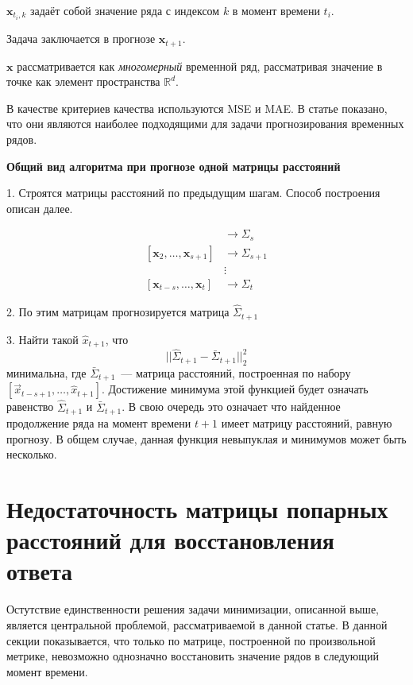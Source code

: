 \documentclass{article}
\begin{document}
$\mathbf{x}_{t_i, k}$ задаёт собой значение ряда с индексом $k$ в момент времени $t_i$.

Задача заключается в прогнозе $\mathbf{x}_{t+1}$.

$\mathbf{x}$ рассматривается как \textit{многомерный} временной ряд, рассматривая значение в точке как элемент пространства $\mathbb{R}^d$.

В качестве критериев качества используются MSE и MAE. В статье \cite{jadon2022comprehensive} показано, что они являются наиболее подходящими для задачи прогнозирования временных рядов.

\textbf{Общий вид алгоритма при прогнозе одной матрицы расстояний}

1. Строятся матрицы расстояний по предыдущим шагам. Способ построения описан далее.

\begin{align*}
	[\mathbf{x}_1, \ldots, \mathbf{x}_s] &\rightarrow \Sigma_s \\
	[\mathbf{x}_2, \ldots, \mathbf{x}_{s+1}] &\rightarrow \Sigma_{s+1} \\
	&\vdots \\
	[\mathbf{x}_{t-s}, \ldots, \mathbf{x}_t] &\rightarrow \Sigma_{t}
\end{align*}

2. По этим матрицам прогнозируется матрица $\hat{\Sigma}_{t+1}$

3. Найти такой $\hat{x}_{t+1}$, что \[ ||\hat{\Sigma}_{t+1} - \bar{\Sigma}_{t+1}||_2^2 \] минимальна, где $\bar{\Sigma}_{t+1}$~--- матрица расстояний, построенная по набору $[\vec{x}_{t-s+1}, \ldots, \hat{x}_{t+1}]$. Достижение минимума этой функцией будет означать равенство $\hat{\Sigma}_{t+1}$ и $\bar{\Sigma}_{t+1}$. В свою очередь это означает что найденное продолжение ряда на момент времени $t+1$ имеет матрицу расстояний, равную прогнозу. В общем случае, данная функция невыпуклая и минимумов может быть несколько.

\section{Недостаточность матрицы попарных расстояний для восстановления ответа}

Остутствие единственности решения задачи минимизации, описанной выше, является центральной проблемой, рассматриваемой в данной статье. В данной секции показывается, что только по матрице, построенной по произвольной метрике, невозможно однозначно восстановить значение рядов в следующий момент времени.
\end{document}
